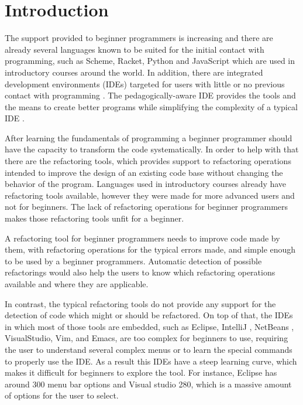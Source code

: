 \section{Introduction}

The support provided to beginner programmers is increasing and there are already
several languages known to be suited for the initial contact with programming, such as Scheme, Racket,
Python and JavaScript which are used in introductory courses around the world.
In addition, there are integrated development environments (IDEs) targeted for
 users with little or no previous contact with programming \cite{kolling2003bluej}. %
The pedagogically-aware %
 IDE provides the tools and the means to create better programs while simplifying
the complexity of a typical IDE \cite{pears2007survey}.%

After learning the fundamentals of programming a beginner programmer should have the
capacity to transform the code systematically.
In order to help with that there are the refactoring tools,
which provides support to refactoring operations intended to improve the design
of an existing code base \cite{fowler1999refactoring} without changing the behavior of the program.
Languages used in introductory courses already have refactoring tools available,
however they were made for more advanced users and not for beginners.
The lack of refactoring operations for beginner programmers makes those refactoring tools
unfit for a beginner.

A refactoring tool for beginner programmers needs to improve code made by them, %
with refactoring operations for the typical errors made, and simple enough to be
used by a beginner programmers.
Automatic detection of possible refactorings would also help the users to know
which refactoring operations available and where they are applicable.

In contrast, the typical refactoring tools do not provide any support for the detection of code which might or should
be refactored.
On top of that, the IDEs in which most of those tools are embedded, such as Eclipse\cite{carlson2005eclipse},
 IntelliJ \cite{bock2011intellij}, NetBeans \cite{boudreau2002netbeans}, VisualStudio\cite{ford2011coding},
 Vim\cite{moolenaar2008vim}, and Emacs\cite{stallman2007gnu}, are too complex for beginners
 to use, requiring the user to understand several complex menus or to learn
 the special commands to properly use the IDE.
As a result this IDEs have a steep learning curve, which makes it difficult for beginners
to explore the tool. %
For instance, Eclipse has around 300 menu bar options and Visual studio 280, which is a massive amount
of options for the user to select.

